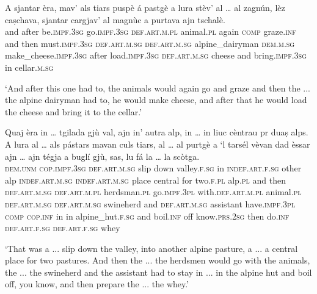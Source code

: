 \begin{linenumbers}
	\gll A sjantar èra, mav’ als tiars puspè á pastgè a lura stèv’ al … al zagnún, lèz caṣchava, sjantar cargjav’ al magnùc a purtava ajn tschalè.   \\
	and after be.\textsc{impf.3sg} go.\textsc{impf.3sg} \textsc{def.art.m.pl} animal.\textsc{pl} again \textsc{comp} graze.\textsc{inf} and then must.\textsc{impf.3sg} \textsc{def.art.m.sg} {} \textsc{def.art.m.sg} alpine\_dairyman \textsc{dem.m.sg} make\_cheese\textsc{.impf.3sg} after load.\textsc{impf.3sg} \textsc{def.art.m.sg} cheese and bring.\textsc{impf.3sg} in cellar.\textsc{m.sg}\\
\end{linenumbers}
\medskip
\glt `And after this one had to, the animals would again go and graze and then the ... the alpine dairyman had to, he would make cheese, and after that he would load the cheese and bring it to the cellar.'
\medskip

\begin{linenumbers}
	\gll  Quaj èra in … tgilada  gjù val, ajn in' autra alp, in … in liuc cèntrau pr duaṣ alps. A lura al … als pástars mavan culs tiars, al … al  purtgè a ‘l tarsél vèvan dad èssar ajn … ajn tégja a buglí gjù, sas, lu fá la … la scòtga.\\
	\textsc{dem.unm} \textsc{cop.impf.3sg} \textsc{def.art.m.sg} {} slip down valley.\textsc{f.sg} in \textsc{indef.art.f.sg} other alp \textsc{indef.art.m.sg} {} \textsc{indef.art.m.sg} place central for two.\textsc{f.pl} alp.\textsc{pl} and then \textsc{def.art.m.sg} {} \textsc{def.art.m.pl} herdsman.\textsc{pl} go.\textsc{impf.3pl} with.\textsc{def.art.m.pl} animal.\textsc{pl} \textsc{def.art.m.sg} {} \textsc{def.art.m.sg} swineherd and \textsc{def.art.m.sg} assistant have.\textsc{impf.3pl} \textsc{comp} \textsc{cop.inf} in {} in alpine\_hut.\textsc{f.sg} and boil.\textsc{inf} off know.\textsc{prs.2sg} then do.\textsc{inf} \textsc{def.art.f.sg} {} \textsc{def.art.f.sg} whey  \\
\end{linenumbers}
\medskip
\glt `That was a ... slip down the valley, into another alpine pasture, a ... a central place for two pastures. And then the ... the herdsmen would go with the animals, the ... the swineherd and the assistant had to stay in ... in the alpine hut and boil off, you know, and then prepare the ... the whey.'
\medskip

